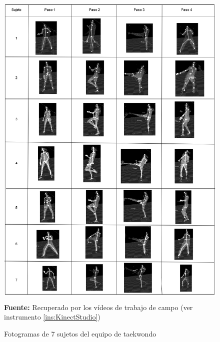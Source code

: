 \begin{figure}[H]
	\caption{Fotogramas de 7 sujetos del equipo de taekwondo}
	\label{fig:fotogramaTaekwondo}
	\centering
	\includegraphics[width=445px,height=600px]{graphics/resultados/SETaekwondo.PNG} \\
	\textbf{Fuente:} Recuperado por los v\'ideos de trabajo de campo (ver instrumento \ref{ins:KinectStudio})
\end{figure}
